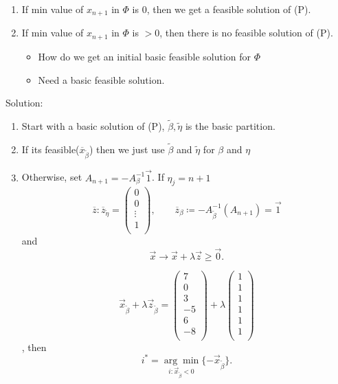 \begin{enumerate}
	\item If min value of \(x_{n+1}\) in \(\Phi \) is 0, then we get a feasible solution of (P).
	\item If min value of \(x_{n+1}\) in \(\Phi \) is \(>0\), then there is no feasible solution of (P).
	      \begin{itemize}
		      \item How do we get an initial basic feasible solution for \(\Phi \)
		      \item Need a basic feasible solution.
	      \end{itemize}
\end{enumerate}

Solution:
\begin{enumerate}
	\item Start with a basic solution of (P), \(\tilde{\beta}, \tilde{\eta}\) is the basic partition.
	\item If its feasible(\(\overline{x}_{\tilde{\beta}}\)) then we just use \(\tilde{\beta}\) and \(\tilde{\eta}\) for \(\beta\) and \(\eta\)
	\item Otherwise, set \(A_{n+1} = -A^{-1}_{\beta}\vec{1}\). If \(\eta_j = n+1\)
	      \[
		      \overline{z} : \overline{z}_{\tilde{\eta}} = \begin{pmatrix}
			      0      \\
			      0      \\
			      \vdots \\
			      1      \\
		      \end{pmatrix},\qquad \overline{z}_{\beta} \coloneqq -A^{-1}_{\tilde{\beta}}(A_{n+1}) = \vec{1}
	      \]
	      and\[
		      \vec{x} \to \vec{x} + \lambda \vec{z} \geq \vec{0}.
	      \] \begin{eg}
		      \[
			      \vec{x}_{\tilde{\beta}} + \lambda \vec{z}_{\tilde{\beta}} = \begin{pmatrix}
				      7  \\
				      0  \\
				      3  \\
				      -5 \\
				      6  \\
				      -8 \\
			      \end{pmatrix} + \lambda \begin{pmatrix}
				      1 \\
				      1 \\
				      1 \\
				      1 \\
				      1 \\
				      1 \\
			      \end{pmatrix}
		      \], then \[
			      i^{*} = \underset{i:\vec{x}_{\tilde{\beta}} < 0}{\arg\min}\{-\vec{x}_{\tilde{\beta}}\}.
		      \]
	      \end{eg}
\end{enumerate}

